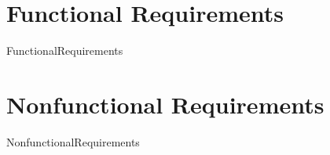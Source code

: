\section{Functional Requirements}
{FunctionalRequirements}

\section{Nonfunctional Requirements}
{NonfunctionalRequirements}